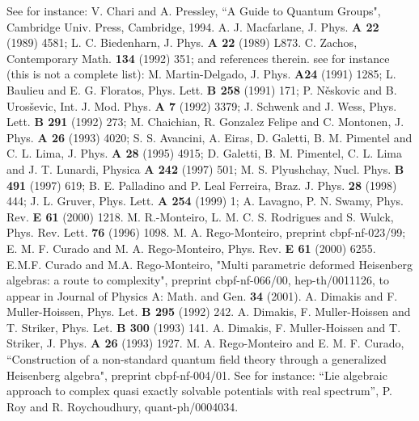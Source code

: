 \documentclass[a4paper,12pt]{article}
\begin{document}
\begin{thebibliography}{20}
 See for instance: V. Chari and A. Pressley, 
``A Guide to Quantum Groups", Cambridge Univ. Press, 
Cambridge, 1994.
 A. J. Macfarlane, J. Phys. {\bf A 22} (1989) 4581;
L. C. Biedenharn, J. Phys. {\bf A 22} (1989) L873.
 C. Zachos, Contemporary Math. {\bf 134} (1992) 351;
and references therein.
 see for instance (this is not a complete list): 
M. Martin-Delgado, J. Phys. {\bf A24}
(1991) 1285; L. Baulieu and E. G. Floratos, Phys. Lett. {\bf B 258}
(1991) 171; P. N\v{e}skovic and B. Uros\v{s}evic, Int. J. Mod. Phys. 
{\bf A 7} (1992) 3379; J. Schwenk and J. Wess, Phys. Lett. {\bf B 291}
(1992) 273; M. Chaichian, R. Gonzalez Felipe and C. Montonen,
J. Phys. {\bf A 26} (1993) 4020; S. S. Avancini, A. Eiras, D. Galetti,
B. M. Pimentel and C. L. Lima, J. Phys. {\bf A 28} (1995) 4915;
D. Galetti, B. M. Pimentel, C. L. Lima and J. T. Lunardi, Physica {\bf A 242}
(1997) 501; M. S. Plyushchay, Nucl. Phys.
{\bf B 491} (1997) 619; B. E. Palladino and P. Leal Ferreira, Braz. J.
Phys. {\bf 28} (1998) 444; J. L. Gruver, Phys. Lett. {\bf A 254} (1999) 1;
A. Lavagno, P. N. Swamy, Phys. Rev. {\bf E 61} (2000) 1218.
 M. R.-Monteiro, L. M. C. S. Rodrigues and S. Wulck,
Phys. Rev. Lett. {\bf 76} (1996) 1098. 
 M. A. Rego-Monteiro, preprint cbpf-nf-023/99; 
E. M. F. Curado and M. A. Rego-Monteiro, Phys. Rev. {\bf E 61} (2000) 6255.
 E.M.F. Curado and M.A. Rego-Monteiro,
"Multi parametric deformed Heisenberg algebras: a route to
complexity", preprint cbpf-nf-066/00, hep-th/0011126, to
appear in Journal of Physics A: Math. and
Gen. {\bf 34} (2001).
 A. Dimakis and F. Muller-Hoissen, Phys. Let.  
{\bf B 295} (1992) 242.
 A. Dimakis, F. Muller-Hoissen and T. Striker, 
Phys. Let.  {\bf B 300} (1993) 141.
 A. Dimakis, F. Muller-Hoissen and T. Striker,
J. Phys. {\bf A 26} (1993) 1927.
 M. A. Rego-Monteiro and E. M. F. Curado, ``Construction 
of a non-standard quantum field theory through a generalized Heisenberg 
algebra", preprint cbpf-nf-004/01.
 See for instance: ``Lie algebraic approach to complex
quasi exactly solvable potentials with real spectrum'', P. Roy and R. 
Roychoudhury, quant-ph/0004034. 
\end{thebibliography}
\end{document}
